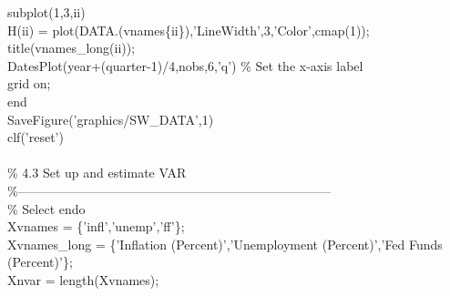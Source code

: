 \hspace{1mm}\hspace{5mm} subplot(1,3,ii) \\ 
\hspace{1mm}\hspace{5mm} H(ii) = plot(DATA.(vnames\{ii\}),\textcolor{matlabpurple}{'LineWidth'},3,\textcolor{matlabpurple}{'Color'},cmap(1)); \\ 
\hspace{1mm}\hspace{5mm} title(vnames\_long(ii));  \\ 
\hspace{1mm}\hspace{5mm} DatesPlot(year+(quarter-1)/4,nobs,6,\textcolor{matlabpurple}{'q'}) \textcolor{matlabgreen}{\% Set the x-axis label  }\\ 
\hspace{1mm}\hspace{5mm} grid on;  \\ 
\hspace{1mm}\textcolor{matlabblue}{end} \\ 
\hspace{1mm}SaveFigure(\textcolor{matlabpurple}{'graphics/SW\_DATA'},1) \\ 
\hspace{1mm}clf(\textcolor{matlabpurple}{'reset'}) \\ 
\hspace{1mm} \\ 
\hspace{1mm}\textcolor{matlabgreen}{\% 4.3 Set up and estimate VAR }\\ 
\hspace{1mm}\textcolor{matlabgreen}{\%--------------------------------------------------------------------------  }\\ 
\hspace{1mm}\textcolor{matlabgreen}{\% Select endo }\\ 
\hspace{1mm}Xvnames      = \{\textcolor{matlabpurple}{'infl'},\textcolor{matlabpurple}{'unemp'},\textcolor{matlabpurple}{'ff'}\}; \\ 
\hspace{1mm}Xvnames\_long = \{\textcolor{matlabpurple}{'Inflation (Percent)'},\textcolor{matlabpurple}{'Unemployment (Percent)'},\textcolor{matlabpurple}{'Fed Funds (Percent)'}\}; \\ 
\hspace{1mm}Xnvar        = length(Xvnames); \\ 
